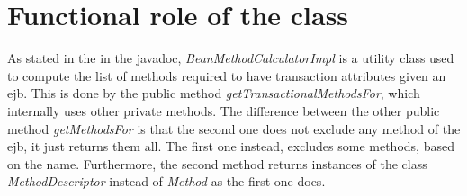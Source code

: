 \section{Functional role of the class}
As stated in the in the javadoc,  \textit{BeanMethodCalculatorImpl} is a utility class used to compute the list of methods required to have transaction attributes given an ejb. This is done by the public method \textit{getTransactionalMethodsFor}, which internally uses other private methods.
The difference between the other public method \textit{getMethodsFor} is that the second one does not exclude any method of the ejb, it just returns them all. The first one instead, excludes some methods, based on the name. Furthermore, the second method returns instances of the class \textit{MethodDescriptor} instead of \textit{Method} as the first one does.